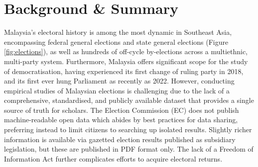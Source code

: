 \documentclass[11pt]{article}
\begin{document}
\section*{Background \& Summary}
Malaysia's electoral history is among the most dynamic in Southeast Asia, encompassing \TOTALCONTESTSFEDERAL\space federal general elections and \TOTALCONTESTSSTATE\space state general elections (Figure \ref{fig:elections}), as well as hundreds of off-cycle by-elections across a multiethnic, multi-party system. Furthermore, Malaysia offers significant scope for the study of democratisation, having experienced its first change of ruling party in 2018, and its first ever hung Parliament as recently as 2022. However, conducting empirical studies of Malaysian elections is challenging due to the lack of a comprehensive, standardised, and publicly available dataset that provides a single source of truth for scholars. The Election Commission (EC) does not publish machine-readable open data which abides by best practices for data sharing, preferring instead to limit citizens to searching up isolated results\cite{mysprsemak}. Slightly richer information is available via gazetted election results published as subsidiary legislation\cite{lompub}, but these are published in PDF format only. The lack of a Freedom of Information Act further complicates efforts to acquire electoral returns.

\begin{figure}[htbp]
\end{figure}
\end{document}
